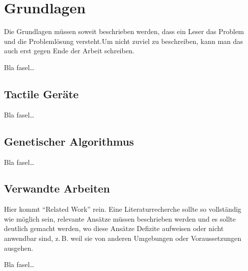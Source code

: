 
\chapter{Grundlagen}
\label{ch:Grundlagen}
Die Grundlagen müssen soweit beschrieben
werden, dass ein Leser das Problem und
die Probleml{\"o}sung  versteht.Um nicht zuviel 
zu beschreiben, kann man das auch erst gegen 
Ende der Arbeit schreiben.

Bla fasel\ldots

\section{Tactile Ger{\"a}te}
\label{ch:Grundlagen:sec:Taktile Ger{\"a}te}

Bla fasel\ldots




\section{Genetischer Algorithmus}
\label{ch:Grundlagen:sec:Genetischer Algorithmus}

Bla fasel\ldots


\section{Verwandte Arbeiten}
\label{ch:Grundlagen:sec:RelatedWork}
Hier kommt "`Related Work"' rein.
Eine Literaturrecherche sollte so vollst{\"a}ndig wie m{\"o}glich sein,
relevante Ans{\"a}tze m{\"u}ssen beschrieben werden und es sollte deutlich 
gemacht werden, wo diese Ans{\"a}tze Defizite aufweisen oder nicht
anwendbar sind, z.\,B. weil sie von anderen Umgebungen oder 
Voraussetzungen ausgehen.

Bla fasel\ldots





